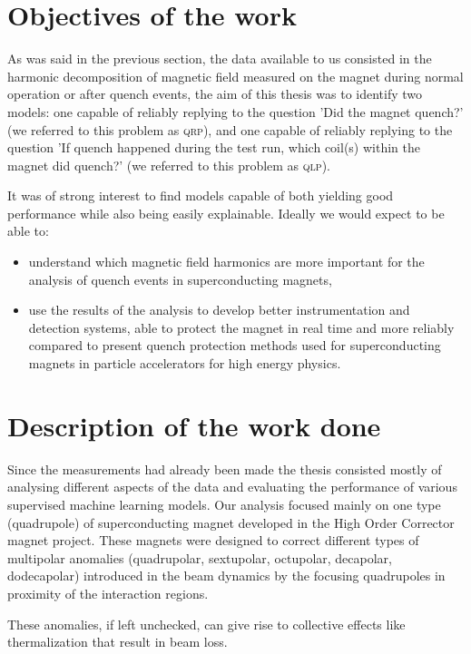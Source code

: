 \documentclass[a4paper, notitlepage]{article}
\begin{document}
\section{Objectives of the work}
As was said in the previous section, the data available to us consisted in the harmonic
decomposition of magnetic field measured on the magnet during normal operation or after quench
events, the aim of this thesis was to identify two models: one capable of reliably
replying to the question 'Did the magnet quench?' (we referred to this problem as \textsc{qrp}), and
one capable of reliably replying to the question 'If quench happened during the test run, which
coil(s) within the magnet did quench?' (we referred to this problem as \textsc{qlp}).

It was of strong interest to find models capable of both yielding good performance while also being
easily explainable. Ideally we would expect to be able to:
\begin{itemize}
	\item understand which magnetic field harmonics are more important for the analysis of
	      quench events in superconducting magnets,
	\item use the results of the analysis to develop better instrumentation and detection
	      systems, able to protect the magnet in real time and more reliably compared to
	      present quench protection methods used for superconducting magnets in particle
	      accelerators for high energy physics.
\end{itemize}

\section{Description of the work done}
Since the measurements had already been made the thesis consisted mostly of analysing different
aspects of the data and evaluating the performance of various supervised machine learning models. Our analysis
focused mainly on one type (quadrupole) of superconducting magnet developed in the High Order
Corrector magnet project. These magnets were designed to correct different types of multipolar
anomalies (quadrupolar, sextupolar, octupolar, decapolar, dodecapolar) introduced in the beam dynamics by
the focusing quadrupoles in proximity of the interaction regions.

These anomalies, if left unchecked, can give rise to collective effects like thermalization that
result in beam loss.
\end{document}
